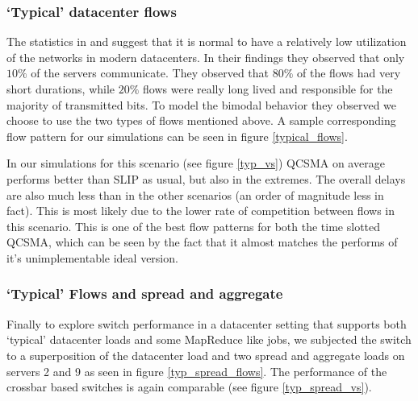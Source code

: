 \documentclass[11pt]{article}%
\begin{document}

\subsubsection{`Typical' datacenter flows}
The statistics in \cite{Benson} and \cite{Kandula} suggest that it is normal to have a relatively low utilization of the networks in modern datacenters.  In their findings they observed that only $10\%$ of the servers communicate.  They observed that $80\%$ of the flows had very short durations, while $20\%$ flows were really long lived and responsible for the majority of transmitted bits.  To model the bimodal behavior they observed we choose to use the two types of flows mentioned above.  A sample corresponding flow pattern for our simulations can be seen in figure \ref{typical_flows}.


In our simulations for this scenario (see figure \ref{typ_vs}) QCSMA on average performs better than SLIP as usual, but also in the extremes.  The overall delays are also much less than in the other scenarios (an order of magnitude less in fact).  This is most likely due to the lower rate of competition between flows in this scenario.  This is one of the best flow patterns for both the time slotted QCSMA, which can be seen by the fact that it almost matches the performs of it's unimplementable ideal version.

%

\subsubsection{`Typical' Flows and spread and aggregate}
Finally to explore switch performance in a datacenter setting that supports both  `typical' datacenter loads and some MapReduce like jobs, we subjected the switch to a superposition of the datacenter load and two spread and aggregate loads on servers 2 and 9 as seen in figure \ref{typ_spread_flows}.  The performance of the crossbar based switches is again comparable (see figure \ref{typ_spread_vs}).
\end{document}
